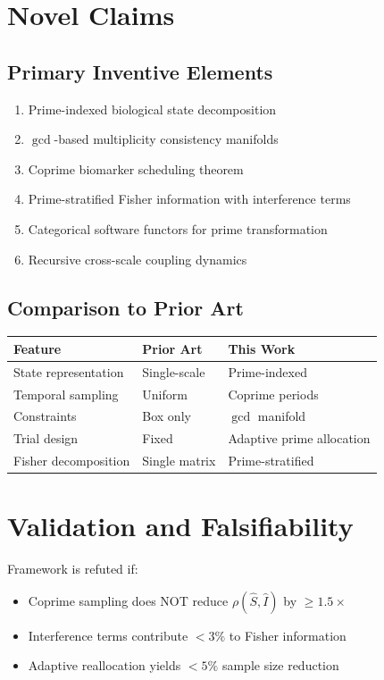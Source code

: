 \documentclass[11pt,letterpaper]{article}
\begin{document}
\section{Novel Claims}

\subsection{Primary Inventive Elements}

\begin{enumerate}
\item Prime-indexed biological state decomposition
\item $\gcd$-based multiplicity consistency manifolds
\item Coprime biomarker scheduling theorem
\item Prime-stratified Fisher information with interference terms
\item Categorical software functors for prime transformation
\item Recursive cross-scale coupling dynamics
\end{enumerate}

\subsection{Comparison to Prior Art}

\begin{table}[h]
\centering
\begin{tabular}{lll}
\toprule
\textbf{Feature} & \textbf{Prior Art} & \textbf{This Work} \\
\midrule
State representation & Single-scale & Prime-indexed \\
Temporal sampling & Uniform & Coprime periods \\
Constraints & Box only & $\gcd$ manifold \\
Trial design & Fixed & Adaptive prime allocation \\
Fisher decomposition & Single matrix & Prime-stratified \\
\bottomrule
\end{tabular}
\end{table}

\section{Validation and Falsifiability}

Framework is refuted if:
\begin{itemize}
\item Coprime sampling does NOT reduce $\rho(\hat{S}, \hat{I})$ by $\geq 1.5\times$
\item Interference terms contribute $< 3\%$ to Fisher information
\item Adaptive reallocation yields $< 5\%$ sample size reduction
\end{itemize}
\end{document}
